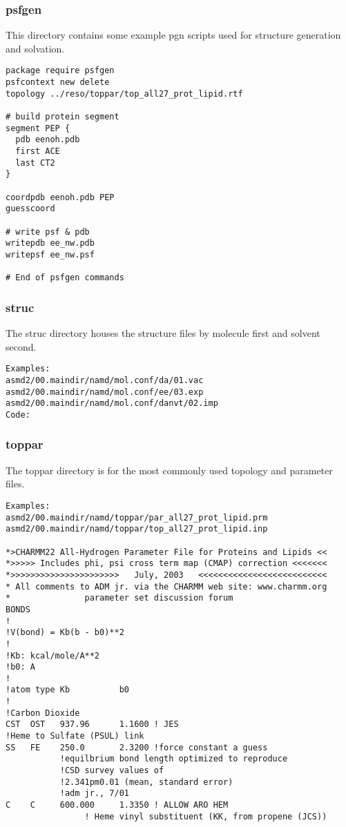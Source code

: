 \documentclass[11pt]{article}
\begin{document}
\subsubsection{psfgen}
This directory contains some example pgn scripts used for structure generation and solvation. 
\begin{verbatim}
package require psfgen
psfcontext new delete
topology ../reso/toppar/top_all27_prot_lipid.rtf

# build protein segment
segment PEP {
  pdb eenoh.pdb
  first ACE
  last CT2
}

coordpdb eenoh.pdb PEP
guesscoord

# write psf & pdb
writepdb ee_nw.pdb
writepsf ee_nw.psf

# End of psfgen commands
\end{verbatim}

\subsubsection{struc}
The struc directory houses the structure files by molecule first and solvent second.
\begin{verbatim}
Examples:
asmd2/00.maindir/namd/mol.conf/da/01.vac
asmd2/00.maindir/namd/mol.conf/ee/03.exp
asmd2/00.maindir/namd/mol.conf/danvt/02.imp
Code:

\end{verbatim}

\subsubsection{toppar}
The toppar directory is for the most commonly used topology and parameter files.
\begin{verbatim}
Examples:
asmd2/00.maindir/namd/toppar/par_all27_prot_lipid.prm
asmd2/00.maindir/namd/toppar/top_all27_prot_lipid.inp

*>CHARMM22 All-Hydrogen Parameter File for Proteins and Lipids <<
*>>>>> Includes phi, psi cross term map (CMAP) correction <<<<<<<
*>>>>>>>>>>>>>>>>>>>>>>   July, 2003   <<<<<<<<<<<<<<<<<<<<<<<<<<
* All comments to ADM jr. via the CHARMM web site: www.charmm.org
*               parameter set discussion forum
BONDS
!
!V(bond) = Kb(b - b0)**2
!
!Kb: kcal/mole/A**2
!b0: A
!
!atom type Kb          b0
!
!Carbon Dioxide
CST  OST   937.96      1.1600 ! JES
!Heme to Sulfate (PSUL) link
SS   FE    250.0       2.3200 !force constant a guess
           !equilbrium bond length optimized to reproduce 
           !CSD survey values of
           !2.341pm0.01 (mean, standard error)
           !adm jr., 7/01
C    C     600.000     1.3350 ! ALLOW ARO HEM
                ! Heme vinyl substituent (KK, from propene (JCS))

\end{verbatim}
\end{document}
